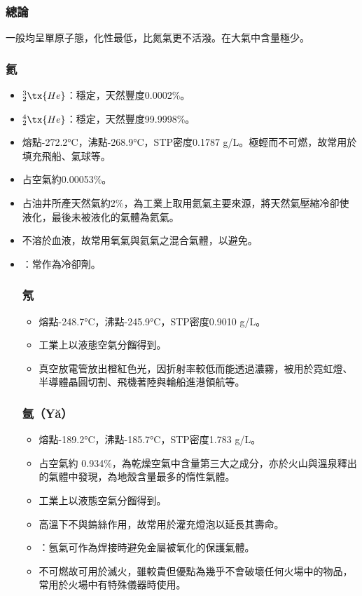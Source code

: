 \documentclass[a4paper,12pt]{report}
\begin{document}
\begin{itemize}
\subsubsection{總論}
一般均呈單原子態，化性最低，比氮氣更不活潑。在大氣中含量極少。
\subsubsection{氦}
\begin{itemize}
\item $^3_2\tx{He}$：穩定，天然豐度0.0002\%。
\item $^4_2\tx{He}$：穩定，天然豐度99.9998\%。
\item 熔點-272.2°C，沸點-268.9°C，STP密度0.1787 g/L。極輕而不可燃，故常用於填充飛船、氣球等。
\item 占空氣約0.00053\%。
\item 占油井所產天然氣約2\%，為工業上取用氦氣主要來源，將天然氣壓縮冷卻使液化，最後未被液化的氣體為氦氣。
\item 不溶於血液，故常用氧氣與氦氣之混合氣體，以避免。
\item {}：常作為冷卻劑。
\subsubsection{氖}
\begin{itemize}
\item 熔點-248.7°C，沸點-245.9°C，STP密度0.9010 g/L。
\item 工業上以液態空氣分餾得到。
\item 真空放電管放出橙紅色光，因折射率較低而能透過濃霧，被用於霓虹燈、半導體晶圓切割、飛機著陸與輪船進港領航等。
\end{itemize}
\subsubsection{氬（Yă）}
\begin{itemize}
\item 熔點-189.2°C，沸點-185.7°C，STP密度1.783 g/L。
\item 占空氣約 0.934\%，為乾燥空氣中含量第三大之成分，亦於火山與溫泉釋出的氣體中發現，為地殼含量最多的惰性氣體。
\item 工業上以液態空氣分餾得到。
\item 高溫下不與鎢絲作用，故常用於灌充燈泡以延長其壽命。
\item {}：氬氣可作為焊接時避免金屬被氧化的保護氣體。
\item 不可燃故可用於滅火，雖較貴但優點為幾乎不會破壞任何火場中的物品，常用於火場中有特殊儀器時使用。
\end{itemize}

\end{itemize}
\end{itemize}
\end{document}
